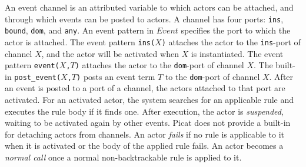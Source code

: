An event channel is an attributed variable to which actors can be attached, and through which events can be posted to actors. A channel has four ports: \texttt{ins}, \texttt{bound}, \texttt{dom}, and \texttt{any}. An event pattern in $Event$ specifies the port to which the actor is attached. The event pattern \texttt{ins($X$)} attaches the actor to the \texttt{ins}-port of channel $X$, and the actor will be activated when $X$ is instantiated. The event pattern \texttt{event($X$,$T$)} attaches the actor to the \texttt{dom}-port of channel $X$. The built-in \texttt{post\_event($X$,$T$)} posts an event term \texttt{$T$} to the \texttt{dom}-port of channel $X$. After an event is posted to a port of a channel, the actors attached to that port are activated. For an activated actor, the system searches for an applicable rule and executes the rule body if it finds one. After execution, the actor is \emph{suspended}, waiting to be activated again by other events. Picat does not provide a built-in for detaching actors from channels. An actor \emph{fails} if no rule is applicable to it when it is activated or the body of the applied rule fails. An actor becomes a \emph{normal call} once a normal non-backtrackable rule is applied to it.

